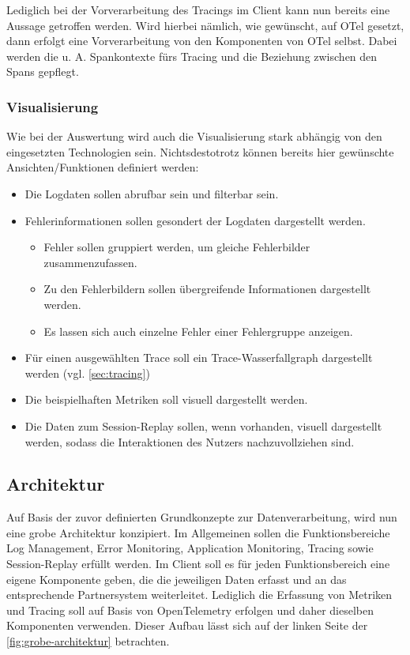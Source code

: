 	Lediglich bei der Vorverarbeitung des Tracings im Client kann nun bereits eine Aussage getroffen werden. Wird hierbei nämlich, wie gewünscht, auf OTel gesetzt, dann erfolgt eine Vorverarbeitung von den Komponenten von OTel selbst. Dabei werden die u. A. Spankontexte fürs Tracing und die Beziehung zwischen den Spans gepflegt.
	
	\subsubsection{Visualisierung}
		
	Wie bei der Auswertung wird auch die Visualisierung stark abhängig von den eingesetzten Technologien sein. Nichtsdestotrotz können bereits hier gewünschte Ansichten/Funktionen definiert werden:
	
	\begin{itemize}
		\item Die Logdaten sollen abrufbar sein und filterbar sein.
		\item Fehlerinformationen sollen gesondert der Logdaten dargestellt werden.
		\begin{itemize}
			\item Fehler sollen gruppiert werden, um gleiche Fehlerbilder zusammenzufassen.
			\item Zu den Fehlerbildern sollen übergreifende Informationen dargestellt werden.
			\item Es lassen sich auch einzelne Fehler einer Fehlergruppe anzeigen.
		\end{itemize}
		\item Für einen ausgewählten Trace soll ein Trace-Wasserfallgraph dargestellt werden (vgl. \autoref{sec:tracing})
		\item Die beispielhaften Metriken soll visuell dargestellt werden.
		\item Die Daten zum Session-Replay sollen, wenn vorhanden, visuell dargestellt werden, sodass die Interaktionen des Nutzers nachzuvollziehen sind.
	\end{itemize}
	
	\subsection{Architektur}

	Auf Basis der zuvor definierten Grundkonzepte zur Datenverarbeitung, wird nun eine grobe Architektur konzipiert. Im Allgemeinen sollen die Funktionsbereiche Log Management, Error Monitoring, Application Monitoring, Tracing sowie Session-Replay erfüllt werden. Im Client soll es für jeden Funktionsbereich eine eigene Komponente geben, die die jeweiligen Daten erfasst und an das entsprechende Partnersystem weiterleitet. Lediglich die Erfassung von Metriken und Tracing soll auf Basis von OpenTelemetry erfolgen und daher dieselben Komponenten verwenden. Dieser Aufbau lässt sich auf der linken Seite der \autoref{fig:grobe-architektur} betrachten.
	
